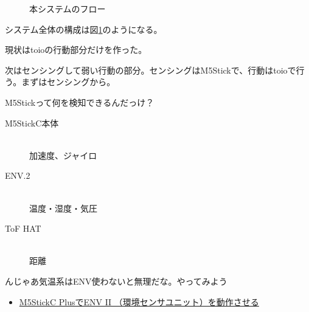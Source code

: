 \documentclass[fleqn,twocolumn]{mynote}
\begin{document}
\fboxsep=0pt            %
\fboxrule=1pt            %
\begin{figure}[h]
  \centering
  \caption{本システムのフロー}
  \label{fig:weak-toio-system-flow}
\end{figure}

システム全体の構成は図\ref*{fig:weak-toio-system-flow}のようになる。

現状はtoioの行動部分だけを作った。

次はセンシングして弱い行動の部分。センシングはM5Stickで、行動はtoioで行う。まずはセンシングから。

M5Stickって何を検知できるんだっけ？

\begin{description}
  \item[M5StickC本体]\mbox{}\\
    加速度、ジャイロ
  \item[ENV.2]\mbox{}\\
    温度・湿度・気圧
  \item[ToF HAT]\mbox{}\\
    距離
\end{description}

んじゃあ気温系はENV使わないと無理だな。やってみよう

\begin{itemize}
  \item \href{https://qiita.com/visyeii/items/e28f8500f43166710664}{M5StickC PlusでENV II （環境センサユニット）を動作させる}
\end{itemize}
\end{document}
